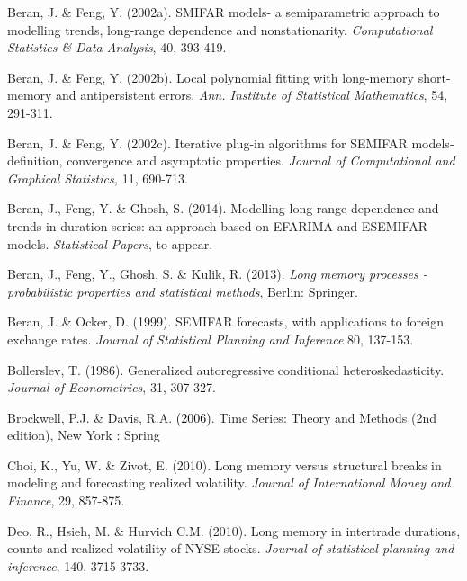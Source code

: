 \documentclass[12pt]{article}
\begin{document}
\begin{description}

\item
Beran, J. \& Feng, Y. (2002a). SMIFAR models- a semiparametric approach to modelling trends, long-range dependence and nonstationarity. \textsl{Computational Statistics \& Data Analysis}, 40, 393-419.

\item
Beran, J. \& Feng, Y. (2002b). Local polynomial fitting with long-memory short-memory and antipersistent errors. \textsl{Ann. Institute of Statistical Mathematics}, 54, 291-311.

\item
Beran, J. \& Feng, Y. (2002c). Iterative plug-in algorithms for SEMIFAR models-definition, convergence and asymptotic properties. \textsl{Journal of Computational and Graphical Statistics,} 11, 690-713.



\item
Beran, J., Feng, Y. \& Ghosh, S. (2014). Modelling long-range dependence and trends in duration series: an approach based on EFARIMA and ESEMIFAR models.  {\it Statistical Papers}, to appear.

\item
Beran, J., Feng, Y., Ghosh, S. \& Kulik, R. (2013). {\it Long memory processes - probabilistic properties and statistical methods}, Berlin: Springer.

\item
Beran, J. \& Ocker, D. (1999). SEMIFAR forecasts, with applications to foreign exchange rates. \textsl{Journal of Statistical Planning and Inference} 80, 137-153.


\item
Bollerslev, T. (1986). Generalized autoregressive conditional heteroskedasticity. \textsl{Journal of Econometrics}, 31, 307-327.

\item
Brockwell, P.J. \& Davis, R.A. \textcolor{black}{(2006)}. Time Series: Theory and Methods (2nd edition), New York : Spring

\item
Choi, K., Yu, W. \& Zivot, E. (2010). Long memory versus structural breaks in modeling and forecasting realized volatility. {\it Journal of International Money and Finance}, 29, 857-875.

\item
Deo, R., Hsieh, M. \& Hurvich C.M. (2010). Long memory in intertrade durations, counts and realized volatility of NYSE stocks. \textsl{Journal of statistical planning and inference}, 140, 3715-3733.


\end{description}
\end{document}
